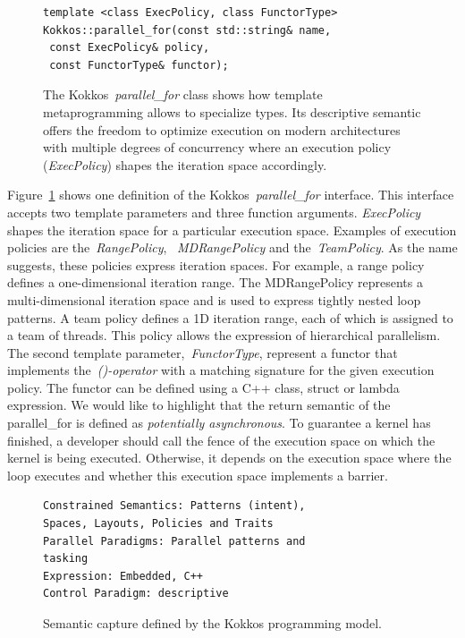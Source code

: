 \begin{figure}[t!]
\begin{verbatim}
template <class ExecPolicy, class FunctorType>
Kokkos::parallel_for(const std::string& name, 
 const ExecPolicy& policy, 
 const FunctorType& functor);
\end{verbatim}
\caption{The Kokkos~\emph{parallel\_for} class shows how template metaprogramming allows to specialize types. Its descriptive semantic offers the freedom to optimize execution on modern architectures with multiple degrees of concurrency where an execution policy (\emph{ExecPolicy}) shapes the iteration space accordingly.}
\label{fig:parallelFor}
\end{figure}

Figure~\ref{fig:parallelFor} shows one definition of the Kokkos~\emph{parallel\_for} interface. This interface accepts two template parameters and three function arguments. \emph{ExecPolicy} shapes the iteration space for a particular execution space. Examples of execution policies are the~\emph{RangePolicy}, ~\emph{MDRangePolicy} and the~\emph{TeamPolicy}. As the name suggests, these policies express iteration spaces. For example, a range policy defines a one-dimensional iteration range. The MDRangePolicy represents a multi-dimensional iteration space and is used to express tightly nested loop patterns. A team policy defines a 1D iteration range, each of which is assigned to a team of threads. This policy allows the expression of hierarchical parallelism. The second template parameter,~\emph{FunctorType}, represent a functor that implements the~\emph{()-operator} with a matching signature for the given execution policy. The functor can be defined using a C++ class, struct or lambda expression. We would like to highlight that the return semantic of the parallel\_for is defined as \emph{potentially asynchronous}. To guarantee a kernel has finished, a developer should call the fence of the execution space on which the kernel is being executed. Otherwise, it depends on the execution space where the loop executes and whether this execution space implements a barrier. 

\begin{figure}[t!]
\begin{verbatim}
Constrained Semantics: Patterns (intent),
Spaces, Layouts, Policies and Traits
Parallel Paradigms: Parallel patterns and 
tasking
Expression: Embedded, C++
Control Paradigm: descriptive
\end{verbatim}
\caption{Semantic capture defined by the Kokkos programming model.}
\label{fig:SemCaptureKokkos}
\end{figure}

